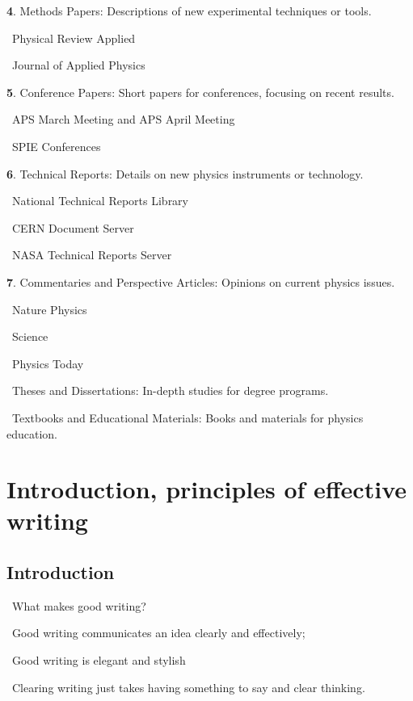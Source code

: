 \documentclass[a4paper,12pt]{article}
\begin{document}
\textbf{4}. Methods Papers: Descriptions of new experimental techniques or tools.
\par\quad\textopenbullet\ Physical Review Applied
\par\quad\textopenbullet\ Journal of Applied Physics

\textbf{5}. Conference Papers: Short papers for conferences, focusing on recent results.
\par\quad\textopenbullet\ APS March Meeting and APS April Meeting
\par\quad\textopenbullet\ SPIE Conferences

\textbf{6}. Technical Reports: Details on new physics instruments or technology.
\par\quad\textopenbullet\ National Technical Reports Library
\par\quad\textopenbullet\ CERN Document Server
\par\quad\textopenbullet\ NASA Technical Reports Server

\textbf{7}. Commentaries and Perspective Articles: Opinions on current physics issues.
\par\quad\textopenbullet\ Nature Physics
\par\quad\textopenbullet\ Science
\par\quad\textopenbullet\ Physics Today

\par\textbullet\ Theses and Dissertations: In-depth studies for degree programs.
\par\textbullet\ Textbooks and Educational Materials: Books and materials for physics education.

\newpage\section{Introduction, principles of effective writing}

\subsection{Introduction}

\par\textbullet\ What makes good writing?
\par\quad\textopenbullet\ Good writing communicates an idea clearly and effectively;
\par\quad\textopenbullet\ Good writing is elegant and stylish

\par\textbullet\ Clearing writing just takes having something to say and clear thinking.
\end{document}
